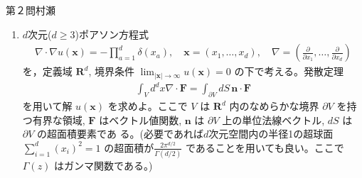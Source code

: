 \begin{question}{第２問}{村瀬}
\begin{enumerate}
\item
  $d$次元($d\ge3$)ポアソン方程式
  \begin{align*}
    \nabla\cdot\nabla u(\bm{x}) = -\prod_{a=1}^d \delta(x_a),\quad
    \bm{x} = (x_1,\ldots,x_d),\quad
    \nabla=\left(\frac{\partial}{\partial x_1}, \ldots, \frac{\partial}{\partial x_d}\right)
  \end{align*}
  を，定義域 $\mathbf{R}^d$, 境界条件 $\displaystyle \lim_{|\bm{x}|\to \infty}u(\bm{x})=0$ の下で考える。発散定理
  \begin{align*}
    \int_V d^dx \nabla\cdot \bm{F} = \int_{\partial V} dS\,\bm{n} \cdot \bm{F}
  \end{align*}
  を用いて解 $u(\bm{x})$ を求めよ。ここで $V$ は $\mathbf{R}^d$ 内のなめらかな境界 $\partial V$ を持つ有界な領域,
  $\bm{F}$ はベクトル値関数, $\bm{n}$ は $\partial V$ 上の単位法線ベクトル, $dS$ は $\partial V$ の超面積要素であ
  る。(必要であれば$d$次元空間内の半径1の超球面 $\sum_{i=1}^d (x_i)^2=1$ の超面積が$\frac{2\pi^{d/2}}{\Gamma(d/2)}$
  であることを用いても良い。ここで $\Gamma(z)$ はガンマ関数である。)

\end{enumerate}
\end{question}
